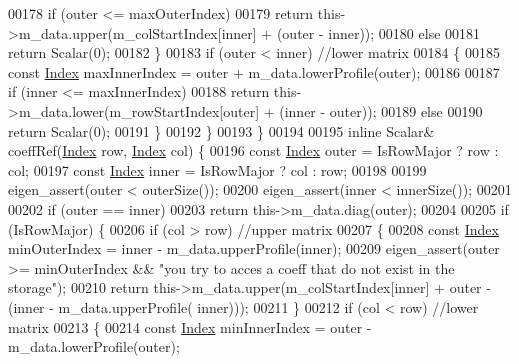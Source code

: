 \begin{DoxyCode}
00178                 \textcolor{keywordflow}{if} (outer <= maxOuterIndex)
00179                     \textcolor{keywordflow}{return} this->m\_data.upper(m\_colStartIndex[inner] + (outer - inner));
00180                 \textcolor{keywordflow}{else}
00181                     \textcolor{keywordflow}{return} Scalar(0);
00182             \}
00183             \textcolor{keywordflow}{if} (outer < inner) \textcolor{comment}{//lower matrix}
00184             \{
00185                 \textcolor{keyword}{const} \hyperlink{namespace_eigen_a62e77e0933482dafde8fe197d9a2cfde}{Index} maxInnerIndex = outer + m\_data.lowerProfile(outer);
00186 
00187                 \textcolor{keywordflow}{if} (inner <= maxInnerIndex)
00188                     \textcolor{keywordflow}{return} this->m\_data.lower(m\_rowStartIndex[outer] + (inner - outer));
00189                 \textcolor{keywordflow}{else}
00190                     \textcolor{keywordflow}{return} Scalar(0);
00191             \}
00192         \}
00193     \}
00194 
00195     \textcolor{keyword}{inline} Scalar& coeffRef(\hyperlink{namespace_eigen_a62e77e0933482dafde8fe197d9a2cfde}{Index} row, \hyperlink{namespace_eigen_a62e77e0933482dafde8fe197d9a2cfde}{Index} col) \{
00196         \textcolor{keyword}{const} \hyperlink{namespace_eigen_a62e77e0933482dafde8fe197d9a2cfde}{Index} outer = IsRowMajor ? row : col;
00197         \textcolor{keyword}{const} \hyperlink{namespace_eigen_a62e77e0933482dafde8fe197d9a2cfde}{Index} inner = IsRowMajor ? col : row;
00198 
00199         eigen\_assert(outer < outerSize());
00200         eigen\_assert(inner < innerSize());
00201 
00202         \textcolor{keywordflow}{if} (outer == inner)
00203             \textcolor{keywordflow}{return} this->m\_data.diag(outer);
00204 
00205         \textcolor{keywordflow}{if} (IsRowMajor) \{
00206             \textcolor{keywordflow}{if} (col > row) \textcolor{comment}{//upper matrix}
00207             \{
00208                 \textcolor{keyword}{const} \hyperlink{namespace_eigen_a62e77e0933482dafde8fe197d9a2cfde}{Index} minOuterIndex = inner - m\_data.upperProfile(inner);
00209                 eigen\_assert(outer >= minOuterIndex && \textcolor{stringliteral}{"you try to acces a coeff that do not exist in the
       storage"});
00210                 \textcolor{keywordflow}{return} this->m\_data.upper(m\_colStartIndex[inner] + outer - (inner - m\_data.upperProfile(
      inner)));
00211             \}
00212             \textcolor{keywordflow}{if} (col < row) \textcolor{comment}{//lower matrix}
00213             \{
00214                 \textcolor{keyword}{const} \hyperlink{namespace_eigen_a62e77e0933482dafde8fe197d9a2cfde}{Index} minInnerIndex = outer - m\_data.lowerProfile(outer);

\end{DoxyCode}
